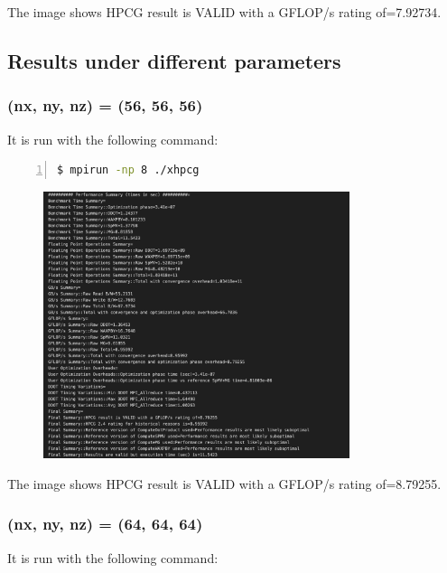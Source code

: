 \documentclass{article}
\begin{document}
The image shows HPCG result is VALID with a GFLOP/s rating of=7.92734.

\clearpage

\subsection*{Results under different parameters}

\subsubsection*{(nx, ny, nz) = (56, 56, 56)}

It is run with the following command:

\begin{lstlisting}[language=bash, basicstyle=\ttfamily\small, numbers=left, numberstyle=\tiny\color{gray}, stepnumber=1, frame=single]
$ mpirun -np 8 ./xhpcg
\end{lstlisting}

\begin{figure}[htbp]
    \centering
    \includegraphics[width=0.8\textwidth]{./img/HPCG_56_56_56.png}
\end{figure}

The image shows HPCG result is VALID with a GFLOP/s rating of=8.79255.

\clearpage

\subsubsection*{(nx, ny, nz) = (64, 64, 64)}

It is run with the following command:
\end{document}
